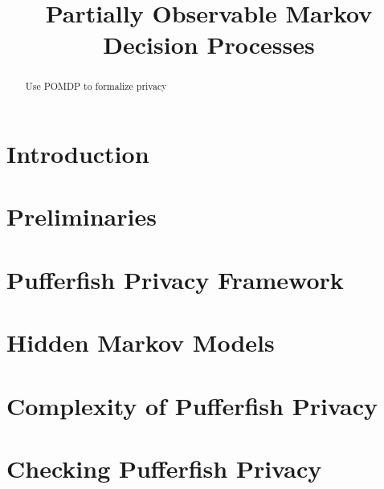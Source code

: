 \documentclass{llncs}
\title{Partially Observable Markov Decision Processes}
\begin{document}
\maketitle

\begin{abstract}
  Use POMDP to formalize privacy
\end{abstract}

\section{Introduction}
\label{section:introduction}


\section{Preliminaries}
\label{section:preliminaries}


\section{Pufferfish Privacy Framework}
\label{section:pufferfish}


\section{Hidden Markov Models}


\section{Complexity of Pufferfish Privacy}
\label{section:complexity}


\section{Checking Pufferfish Privacy}
\label{section:checking-pufferfish}





\end{document}
